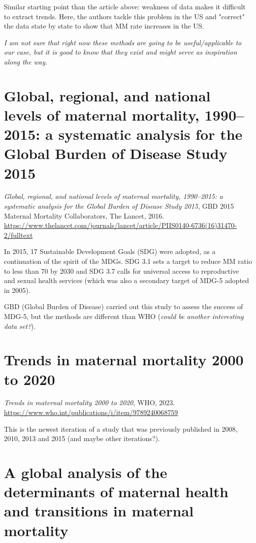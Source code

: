 \documentclass[a4paper,12pt]{article}
\begin{document}
Similar starting point than the article above: weakness of data makes it difficult to extract trends. Here, the authors tackle this problem in the US and "correct" the data state by state to show that MM rate increases in the US.

\textit{I am not sure that right now these methods are going to be useful/applicable to our case, but it is good to know that they exist and might serve as inspiration along the way.}

\section{Global, regional, and national levels of maternal mortality,
1990–2015: a systematic analysis for the Global Burden of
Disease Study 2015}

\textit{Global, regional, and national levels of maternal mortality,
1990–2015: a systematic analysis for the Global Burden of
Disease Study 2015}, GBD 2015 Maternal Mortality Collaborators, The Lancet, 2016.\\
\url{https://www.thelancet.com/journals/lancet/article/PIIS0140-6736(16)31470-2/fulltext}

In 2015, 17 Sustainable Development Goals (SDG) were adopted, as a continuation of the spirit of the MDGs. SDG 3.1 sets a target to reduce MM ratio to less than 70 by 2030 and SDG 3.7 calls for universal access to reproductive and sexual health services (which was also a secondary target of MDG-5 adopted in 2005).

GBD (Global Burden of Disease) carried out this study to assess the success of MDG-5, but the methods are different than WHO (\textit{could be another interesting data set?}). 

\section{Trends in maternal mortality 2000 to 2020}

\textit{Trends in maternal mortality
2000 to 2020}, WHO, 2023.\\
\url{https://www.who.int/publications/i/item/9789240068759}

This is the newest iteration of a study that was previously published in 2008, 2010, 2013 and 2015 (and maybe other iterations?). 

\section{A global analysis of the determinants of maternal health and transitions in maternal mortality}
\end{document}
